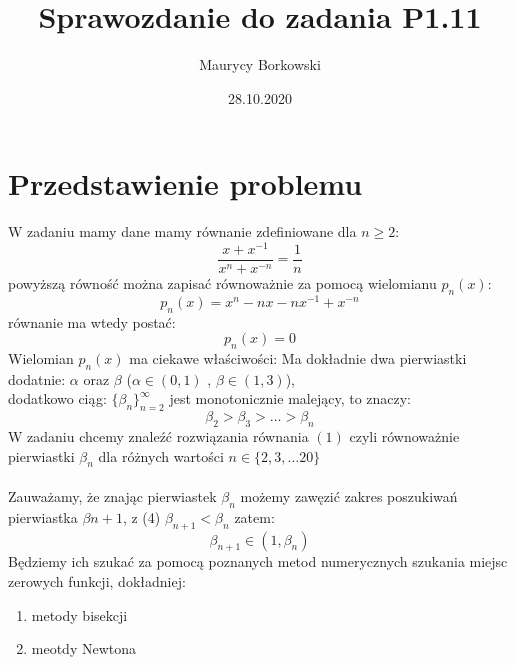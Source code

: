 \documentclass{article}
\title{Sprawozdanie do zadania \textbf{P1.11}}
\date{28.10.2020}
\author{Maurycy Borkowski}
\begin{document}
\maketitle
\section{Przedstawienie problemu}
W zadaniu mamy dane mamy równanie zdefiniowane dla $n \geq 2$:
\begin{equation}
\frac{x + x^{-1}}{x^n + x^{-n}} = \frac{1}{n}
\end{equation}
powyższą równość można zapisać równoważnie za pomocą wielomianu $p_n(x)$:
\begin{equation}
p_n(x) = x^n - nx - nx^{-1} + x^{-n}
\end{equation}
równanie ma wtedy postać:
\begin{equation}
p_n(x) = 0
\end{equation}
Wielomian $p_n(x)$ ma ciekawe właściwości:
\newline Ma dokładnie dwa pierwiastki dodatnie: $\alpha$ oraz $\beta$ ($\alpha \in (0,1)$ , $\beta \in (1,3)$), \\dodatkowo ciąg: $\{\beta_n\}^\infty_{n=2}$ jest monotonicznie malejący, to znaczy:
\begin{equation}
\beta_2 > \beta_3 > \ldots > \beta_n
\end{equation}
W zadaniu chcemy znaleźć rozwiązania równania $(1)$ czyli równoważnie pierwiastki $\beta_n$ dla różnych wartości $n \in \{2,3,\ldots 20\}$\\\\
Zauważamy, że znając pierwiastek $\beta_n$ możemy zawęzić zakres poszukiwań pierwiastka $\beta{n+1}$, z (4) $\beta_{n+1} < \beta_{n}$ zatem:
\begin{equation}
\beta_{n+1} \in (1,\beta_n)
\end{equation}
Będziemy ich szukać za pomocą poznanych metod numerycznych szukania miejsc zerowych funkcji, dokładniej:
\begin{enumerate}[label=(\alph*)]
\item metody bisekcji
\item meotdy Newtona
\end{enumerate}
\end{document}
